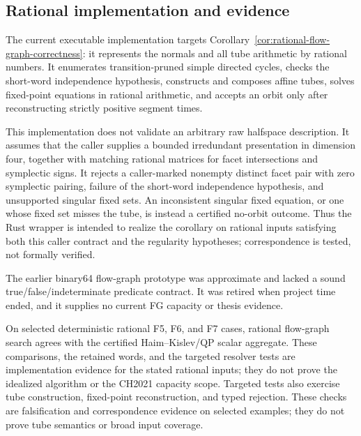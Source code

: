 \subsection{Rational implementation and evidence}
\label{subsec:flow-graph-algorithm-ch2021-implementation}

The current executable implementation targets
Corollary~\ref{cor:rational-flow-graph-correctness}: it represents the normals
and all tube arithmetic by rational numbers.  It enumerates transition-pruned
simple directed cycles,
checks the short-word independence hypothesis, constructs and composes affine
tubes, solves fixed-point equations in rational arithmetic, and accepts an orbit only after
reconstructing strictly positive segment times.

This implementation does not validate an arbitrary raw halfspace description.
It assumes that the caller supplies a bounded irredundant presentation in
dimension four, together with matching rational matrices for facet intersections
and symplectic signs.  It rejects a caller-marked nonempty distinct facet pair
with zero symplectic pairing, failure of the short-word independence
hypothesis, and unsupported singular fixed sets.  An inconsistent singular
fixed equation, or one whose fixed set misses the tube, is instead a certified
no-orbit outcome.  Thus the Rust wrapper is intended to realize the corollary
on rational inputs satisfying both this caller contract and the regularity
hypotheses; correspondence is tested, not formally verified.

The earlier binary64 flow-graph prototype was approximate and lacked a sound
true/false/indeterminate predicate contract. It was retired when project time
ended, and it supplies no current FG capacity or thesis evidence.

On selected deterministic rational F5, F6, and F7 cases, rational flow-graph
search agrees with the certified Haim--Kislev/QP scalar aggregate. These
comparisons, the retained words, and the targeted resolver tests are
implementation evidence for the stated rational inputs; they do not prove the
idealized algorithm or the CH2021 capacity scope.
Targeted tests also exercise tube construction, fixed-point reconstruction,
and typed rejection.  These checks are falsification and correspondence
evidence on selected examples; they do not prove tube semantics or broad input
coverage.
